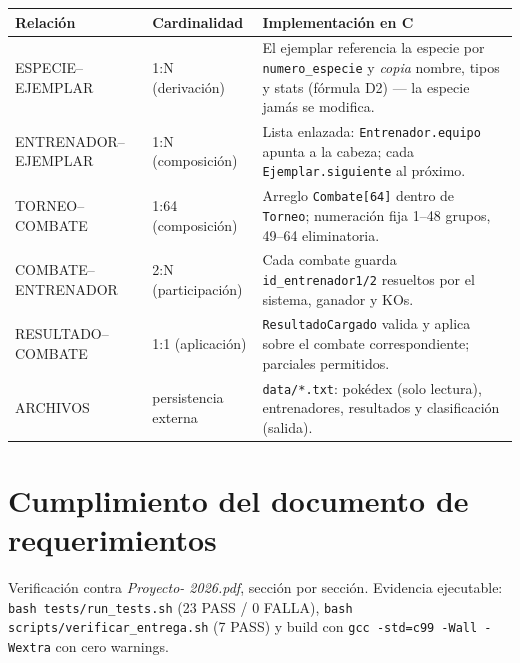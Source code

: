 \documentclass[11pt,a4paper]{article}
\begin{document}
\begin{longtable}{p{3.6cm} p{5.6cm} p{6.0cm}}
\toprule
\textbf{Relaci\'on} & \textbf{Cardinalidad} & \textbf{Implementaci\'on en C} \\
\midrule
ESPECIE--EJEMPLAR & 1:N (derivaci\'on) & El ejemplar referencia la especie por \texttt{numero\_especie} y \emph{copia} nombre, tipos y stats (f\'ormula D2) — la especie jam\'as se modifica. \\
ENTRENADOR--EJEMPLAR & 1:N (composici\'on) & Lista enlazada: \texttt{Entrenador.equipo} apunta a la cabeza; cada \texttt{Ejemplar.siguiente} al pr\'oximo. \\
TORNEO--COMBATE & 1:64 (composici\'on) & Arreglo \texttt{Combate[64]} dentro de \texttt{Torneo}; numeraci\'on fija 1--48 grupos, 49--64 eliminatoria. \\
COMBATE--ENTRENADOR & 2:N (participaci\'on) & Cada combate guarda \texttt{id\_entrenador1/2} resueltos por el sistema, ganador y KOs. \\
RESULTADO--COMBATE & 1:1 (aplicaci\'on) & \texttt{ResultadoCargado} valida y aplica sobre el combate correspondiente; parciales permitidos. \\
ARCHIVOS & persistencia externa & \texttt{data/*.txt}: pok\'edex (solo lectura), entrenadores, resultados y clasificaci\'on (salida). \\
\bottomrule
\end{longtable}

\section{Cumplimiento del documento de requerimientos}
Verificaci\'on contra \emph{Proyecto- 2026.pdf}, secci\'on por secci\'on.
Evidencia ejecutable: \texttt{bash tests/run\_tests.sh} (23 PASS / 0 FALLA),
\texttt{bash scripts/verificar\_entrega.sh} (7 PASS) y build con
\texttt{gcc -std=c99 -Wall -Wextra} con cero warnings.
\end{document}
